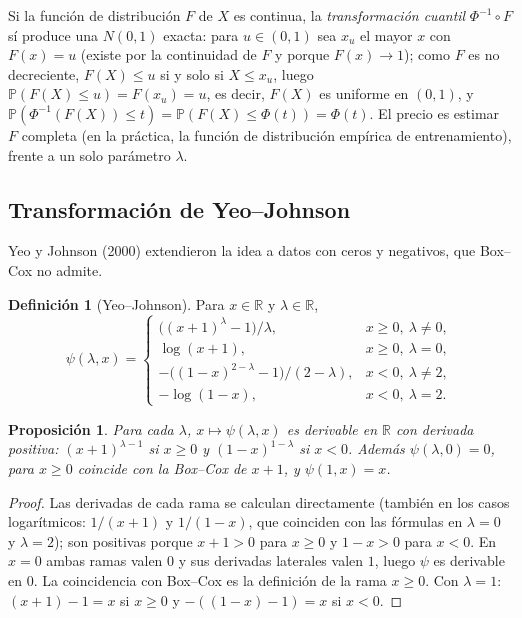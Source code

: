 \documentclass[11pt,a4paper]{article}
\theoremstyle{plain}
\newtheorem{proposicion}[teorema]{Proposición}
\theoremstyle{definition}
\newtheorem{definicion}[teorema]{Definición}
\theoremstyle{remark}
\newcommand{\R}{\mathbb{R}}
\newcommand{\Prob}{\mathbb{P}}
\newcommand{\1}{\mathbf{1}}
\begin{document}
Si la función de distribución $F$ de $X$ es continua, la
\emph{transformación cuantil} $\Phi^{-1}\circ F$ sí produce una $N(0,1)$
exacta: para $u\in(0,1)$ sea $x_u$ el mayor $x$ con $F(x)=u$ (existe por
la continuidad de $F$ y porque $F(x)\to1$); como $F$ es no decreciente,
$F(X)\le u$ si y solo si $X\le x_u$, luego $\Prob(F(X)\le u)=F(x_u)=u$, es
decir, $F(X)$ es uniforme en $(0,1)$, y $\Prob(\Phi^{-1}(F(X))\le
t)=\Prob(F(X)\le\Phi(t))=\Phi(t)$. El precio es estimar $F$ completa (en
la práctica, la función de distribución empírica de entrenamiento), frente
a un solo parámetro $\lambda$.

\subsection{Transformación de Yeo--Johnson}

Yeo y Johnson (2000) extendieron la idea a datos con ceros y negativos,
que Box--Cox no admite.

\begin{definicion}[Yeo--Johnson]
Para $x\in\R$ y $\lambda\in\R$,
\[
\psi(\lambda,x)=\begin{cases}
\bigl((x+1)^\lambda-1\bigr)/\lambda,& x\ge0,\ \lambda\neq0,\\
\log(x+1),& x\ge0,\ \lambda=0,\\
-\bigl((1-x)^{2-\lambda}-1\bigr)/(2-\lambda),& x<0,\ \lambda\neq2,\\
-\log(1-x),& x<0,\ \lambda=2.
\end{cases}
\]
\end{definicion}

\begin{proposicion}
Para cada $\lambda$, $x\mapsto\psi(\lambda,x)$ es derivable en $\R$ con
derivada positiva: $(x+1)^{\lambda-1}$ si $x\ge0$ y $(1-x)^{1-\lambda}$ si
$x<0$. Además $\psi(\lambda,0)=0$, para $x\ge0$ coincide con la Box--Cox
de $x+1$, y $\psi(1,x)=x$.
\end{proposicion}

\begin{proof}
Las derivadas de cada rama se calculan directamente (también en los casos
logarítmicos: $1/(x+1)$ y $1/(1-x)$, que coinciden con las fórmulas en
$\lambda=0$ y $\lambda=2$); son positivas porque $x+1>0$ para $x\ge0$ y
$1-x>0$ para $x<0$. En $x=0$ ambas ramas valen $0$ y sus derivadas
laterales valen $1$, luego $\psi$ es derivable en $0$. La coincidencia
con Box--Cox es la definición de la rama $x\ge0$. Con $\lambda=1$:
$(x+1)-1=x$ si $x\ge0$ y $-((1-x)-1)=x$ si $x<0$.
\end{proof}
\end{document}
